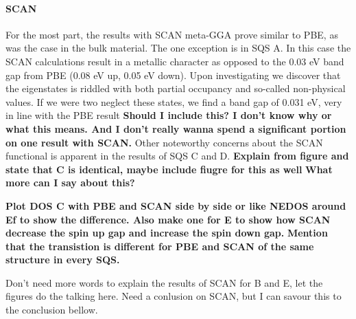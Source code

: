 \paragraph{SCAN \\}
For the most part, the results with SCAN meta-GGA prove similar to PBE, as was the case in the bulk material. The one exception is in SQS A. In this case the SCAN calculations result in a metallic character as opposed to the 0.03 eV band gap from PBE (0.08 eV up, 0.05 eV down). Upon investigating we discover that the eigenstates is riddled with both partial occupancy and so-called non-physical values. If we were two neglect these states, we find a band gap of 0.031 eV, very in line with the PBE result \textbf{Should I include this? I don't know why or what this means. And I don't really wanna spend a significant portion on one result with SCAN.} Other noteworthy concerns about the SCAN functional is apparent in the results of SQS C and D. \textbf{Explain from figure and state that C is identical, maybe include fiugre for this as well} \textbf{What more can I say about this? }

\textbf{Plot DOS C with PBE and SCAN side by side or like NEDOS around Ef to show the difference. Also make one for E to show how SCAN decrease the spin up gap and increase the spin down gap.}       
\textbf{Mention that the transistion is different for PBE and SCAN of the same structure in every SQS.}

Don't need more words to explain the results of SCAN for B and E, let the figures do the talking here. Need a conlusion on SCAN, but I can savour this to the conclusion bellow.

